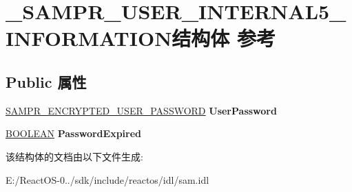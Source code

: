 \hypertarget{struct___s_a_m_p_r___u_s_e_r___i_n_t_e_r_n_a_l5___i_n_f_o_r_m_a_t_i_o_n}{}\section{\+\_\+\+S\+A\+M\+P\+R\+\_\+\+U\+S\+E\+R\+\_\+\+I\+N\+T\+E\+R\+N\+A\+L5\+\_\+\+I\+N\+F\+O\+R\+M\+A\+T\+I\+O\+N结构体 参考}
\label{struct___s_a_m_p_r___u_s_e_r___i_n_t_e_r_n_a_l5___i_n_f_o_r_m_a_t_i_o_n}
\subsection*{Public 属性}
\begin{DoxyCompactItemize}
\item 
\mbox{\label{struct___s_a_m_p_r___u_s_e_r___i_n_t_e_r_n_a_l5___i_n_f_o_r_m_a_t_i_o_n_a3618c58f5f5fb6f54df8fb4b6a05e22e}} 
\hyperlink{struct___s_a_m_p_r___e_n_c_r_y_p_t_e_d___u_s_e_r___p_a_s_s_w_o_r_d}{S\+A\+M\+P\+R\+\_\+\+E\+N\+C\+R\+Y\+P\+T\+E\+D\+\_\+\+U\+S\+E\+R\+\_\+\+P\+A\+S\+S\+W\+O\+RD} {\bfseries User\+Password}
\item 
\mbox{\label{struct___s_a_m_p_r___u_s_e_r___i_n_t_e_r_n_a_l5___i_n_f_o_r_m_a_t_i_o_n_a0fbcb1de615b8d3f7b570e394a98194f}} 
\hyperlink{_processor_bind_8h_a112e3146cb38b6ee95e64d85842e380a}{B\+O\+O\+L\+E\+AN} {\bfseries Password\+Expired}
\end{DoxyCompactItemize}


该结构体的文档由以下文件生成\+:\begin{DoxyCompactItemize}
\item 
E\+:/\+React\+O\+S-\/0../sdk/include/reactos/idl/sam.\+idl\end{DoxyCompactItemize}
